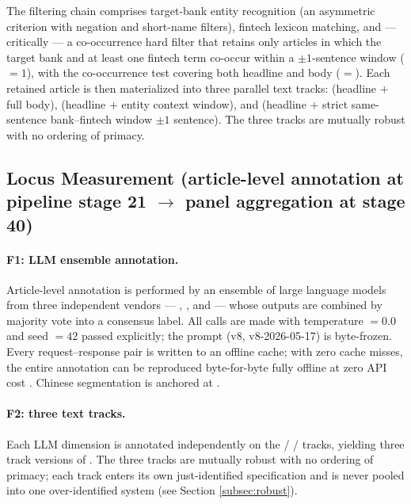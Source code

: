 The filtering chain comprises target-bank entity recognition (an asymmetric criterion
with negation and short-name filters), fintech lexicon matching, and — critically — a
co-occurrence hard filter that retains only articles in which the target bank and at
least one fintech term co-occur within a $\pm 1$-sentence window
($=1$), with the co-occurrence test covering both headline and
body ($=$). Each retained article is then materialized
into three parallel text tracks:  (headline $+$ full body), 
(headline $+$ entity context window), and  (headline $+$ strict same-sentence
bank--fintech window $\pm 1$ sentence). The three tracks are mutually robust with no
ordering of primacy.

\subsection{Locus Measurement (article-level annotation at pipeline stage 21 $\to$ panel aggregation at stage 40)}

\paragraph{F1: LLM ensemble annotation.}
Article-level annotation is performed by an ensemble of large language models from three
independent vendors — , , and
 — whose outputs are combined by majority vote into a consensus
label. All calls are made with temperature $=0.0$ and seed $=42$ passed explicitly; the
prompt (v8, v8-2026-05-17) is byte-frozen. Every request--response pair is written to an
offline cache; with zero cache misses, the entire annotation can be reproduced
byte-for-byte fully offline at zero API cost
\parencite{ludwig2025llmecon,carlson2026llmannotation}. Chinese segmentation is anchored
at .

\paragraph{F2: three text tracks.}
Each LLM dimension is annotated independently on the  /  /
 tracks, yielding three track versions of . The three
tracks are mutually robust with no ordering of primacy; each track enters its own
just-identified specification and is never pooled into one over-identified system (see
Section \ref{subsec:robust}).

